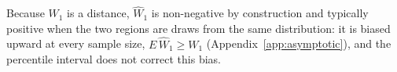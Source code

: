 \documentclass[AMA,Times1COL]{WileyNJDv5}
\begin{document}
Because $W_1$ is a distance, $\widehat{W}_1$ is non-negative by construction and typically positive when the two regions are draws from the same distribution: it is biased upward at every sample size, $E\,\widehat{W}_1 \geq W_1$ (Appendix~\ref{app:asymptotic}), and the percentile interval does not correct this bias. %
\end{document}
